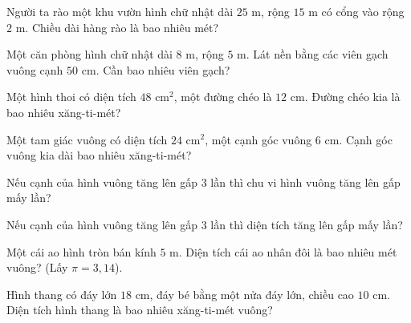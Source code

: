 \begin{ex}
  Người ta rào một khu vườn hình chữ nhật dài $25\text{ m}$, rộng $15\text{ m}$ có cổng vào rộng $2\text{ m}$. Chiều dài hàng rào là bao nhiêu mét?
\end{ex}

\begin{ex}
  Một căn phòng hình chữ nhật dài $8\text{ m}$, rộng $5\text{ m}$. Lát nền bằng các viên gạch vuông cạnh $50\text{ cm}$. Cần bao nhiêu viên gạch?
\end{ex}

\begin{ex}
  Một hình thoi có diện tích $48\text{ cm}^2$, một đường chéo là $12\text{ cm}$. Đường chéo kia là bao nhiêu xăng-ti-mét?
\end{ex}

\begin{ex}
  Một tam giác vuông có diện tích $24\text{ cm}^2$, một cạnh góc vuông $6\text{ cm}$. Cạnh góc vuông kia dài bao nhiêu xăng-ti-mét?
\end{ex}

\begin{ex}
  Nếu cạnh của hình vuông tăng lên gấp 3 lần thì chu vi hình vuông tăng lên gấp mấy lần?
\end{ex}

\begin{ex}
  Nếu cạnh của hình vuông tăng lên gấp 3 lần thì diện tích tăng lên gấp mấy lần?
\end{ex}

\begin{ex}
  Một cái ao hình tròn bán kính $5\text{ m}$. Diện tích cái ao nhân đôi là bao nhiêu mét vuông? (Lấy $\pi = 3{,}14$).
\end{ex}

\begin{ex}
  Hình thang có đáy lớn $18\text{ cm}$, đáy bé bằng một nửa đáy lớn, chiều cao $10\text{ cm}$. Diện tích hình thang là bao nhiêu xăng-ti-mét vuông?
\end{ex}

